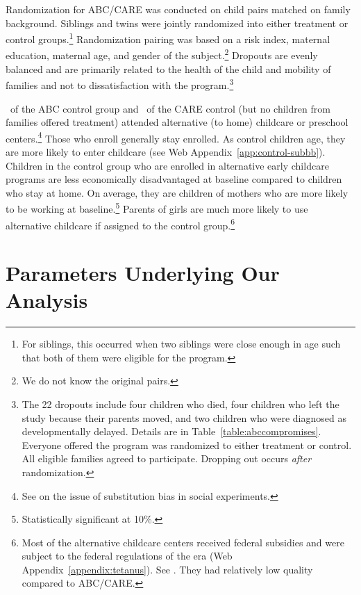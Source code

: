Randomization for ABC/CARE was conducted on child pairs matched on family background. Siblings and twins were jointly randomized into either treatment or control groups.\footnote{For siblings, this occurred when two siblings were close enough in age such that both of them were eligible for the program.} Randomization pairing was based on a risk index, maternal education, maternal age, and gender of the subject.\footnote{We do not know the original pairs.} Dropouts are evenly balanced and are primarily related to the health of the child and mobility of families and not to dissatisfaction with the program.\footnote{The 22 dropouts include four children who died, four children who left the study because their parents moved, and two children who were diagnosed as developmentally delayed. Details are in Table~\ref{table:abccompromises}. Everyone offered the program was randomized to either treatment or control. All eligible families agreed to participate. Dropping out occurs \emph{after} randomization.}

\treatsubsabc\ of the ABC control group and \treatsubscarec\ of the CARE control (but no children from families offered treatment) attended alternative (to home) childcare or preschool centers.\footnote{See \cite{Heckman_Hohmann_etal_2000_QJE} on the issue of substitution bias in social experiments.} Those who enroll generally stay enrolled. As control children age, they are more likely to enter childcare (see Web Appendix~\ref{app:control-subbb}). Children in the control group who are enrolled in alternative early childcare programs are less economically disadvantaged at baseline compared to children who stay at home. On average, they are children of mothers who are more likely to be working at baseline.\footnote{Statistically significant at 10\%.} Parents of girls are much more likely to use alternative childcare if assigned to the control group.\footnote{Most of the alternative childcare centers received federal subsidies and were subject to the federal regulations of the era (Web Appendix~\ref{appendix:tetanus}). See \citet{Department-of-Health_1968_DayCareRequirements,NCGA_1971_House-Bill-100,Ramey-et-al_1977_Intro-to-ABC,Ramey_Campbell_1979_SR,Ramey_McGinness_etal_1982_Abecedarianapproach, Burchinal_Campbell_etal_1997_CD}. They had relatively low quality compared to ABC/CARE.}

\section{Parameters Underlying Our Analysis} \label{section:methodsquestions}

